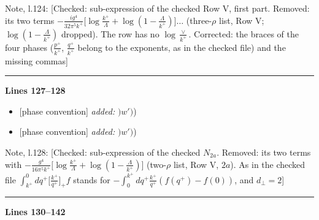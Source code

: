 \documentclass[10pt]{article}
\newenvironment{notebox}{\def\FrameCommand{{\color{notebar}\vrule width 1.5pt}\hspace{6pt}}\MakeFramed{\advance\hsize-\width\FrameRestore}\small}{\endMakeFramed}
\begin{document}
\begin{notebox}\textsf{\small Note, l.124:} [Checked: sub-expression of the checked Row V, first part. Removed: its two terms $-\frac{ig^{4}}{32\pi^{5}k^{+}}\big[\log\frac{k^{+}}{\Lambda}+\log(1-\frac{\Lambda}{k^{+}})\big]\dots$ (three-$\rho$ list, Row V; $\log(1-\frac{\Lambda}{k^{+}})$ dropped). The row has no $\log\frac{\vee}{k^{+}}$. Corrected: the braces of the four phases ($\frac{p^{+}}{k^{+}}$, $\frac{q^{+}}{k^{+}}$ belong to the exponents, as in the checked file) and the missing commas]\end{notebox}
\par
{}\par
{}\noindent\rule{\linewidth}{0.3pt}\par\noindent\textbf{Lines 127--128} \par
\begin{itemize}[leftmargin=2.2em,itemsep=1pt,topsep=2pt]
\item[\textbf{l.127}] \textsf{\small [phase convention]} \emph{added:} $\displaystyle )$$\displaystyle w')${\color{gray}\small)}
\item[\textbf{l.127}] \textsf{\small [phase convention]} \emph{added:} $\displaystyle )$$\displaystyle w')${\color{gray}\small)}
\end{itemize}
\begin{notebox}\textsf{\small Note, l.128:} [Checked: sub-expression of the checked $N_{2a}$. Removed: its two terms with $-\frac{g^{4}}{16\pi^{5}k^{+}}\big[\log\frac{k^{+}}{\Lambda}+\log(1-\frac{\Lambda}{k^{+}})\big]$ (two-$\rho$ list, Row V, $2a$). As in the checked file $\int^{0}_{k^{+}}dq^{+}\big[\frac{k^{+}}{q^{+}}\big]_{+}f$ stands for $-\int_{0}^{k^{+}}dq^{+}\frac{k^{+}}{q^{+}}(f(q^{+})-f(0))$, and $d_{\perp}=2$]\end{notebox}
\par
{}\par
{}\noindent\rule{\linewidth}{0.3pt}\par\noindent\textbf{Lines 130--142} \par
\end{document}
